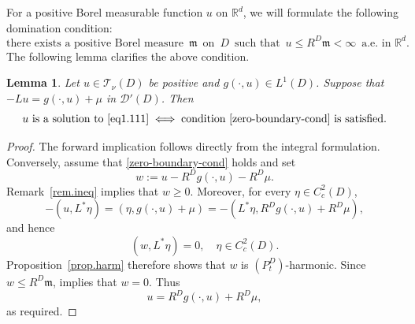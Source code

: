 \documentclass[11pt,a4paper,reqno]{amsart}
\newtheorem{lemma}[theorem]{\bf Lemma}
\theoremstyle{definition}
\numberwithin{equation}{section}
\begin{document}
For a positive Borel measurable function
$u$ on $\mathbb R^d$, we   will formulate  the following domination  condition: 
\begin{equation}
\label{zero-boundary-cond}
\text{there exists a positive Borel measure }\,  \mathfrak m \,\text{ on }\,  D\, \text{ such that }\,  u \le R^D\mathfrak m < \infty \,\text{ a.e. in }\mathbb R^d.
\end{equation}
The following lemma clarifies the above condition.



\begin{lemma}\label{equiv-dirichlet}
Let $u\in\mathscr T_\nu(D)$ be  positive and $g(\cdot,u)\in L^1(D)$. 
Suppose that  $-Lu=g(\cdot,u)+\mu$ in $\mathscr D'(D)$. Then
\[
u \text{ is a solution to }\eqref{eq1.111} \iff \text{condition }\eqref{zero-boundary-cond}\text{ is satisfied.} 
\]
\end{lemma}
\begin{proof}
The forward implication follows directly from the integral formulation. 
Conversely, assume that \eqref{zero-boundary-cond} holds and set 
\[
w:=u-R^Dg(\cdot,u)-R^D\mu. 
\]
Remark~\ref{rem.ineq} implies that \(w\geq0\). Moreover, for every \(\eta\in C_c^2(D)\), 
\[ 
-(u,L^*\eta) = (\eta,g(\cdot,u)+\mu) = -(L^*\eta,R^Dg(\cdot,u)+R^D\mu), 
\] and hence 
\[ 
(w,L^*\eta)=0,\quad \eta\in C_c^2(D).
\] 
Proposition~\ref{prop.harm} therefore shows that \(w\) is \((P_t^D)\)-harmonic. 
Since \(w\leq R^D\mathfrak m\), \cite[Theorem~VI.2.11]{BG} implies that \(w=0\). Thus 
\[
u=R^Dg(\cdot,u)+R^D\mu, 
\]
as required.
\end{proof}
\end{document}
